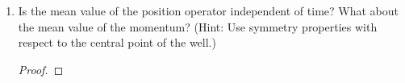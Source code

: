 \documentclass[../psets.tex]{subfiles}
\begin{document}
\begin{enumerate}
\begin{enumerate}
\begin{proof}
\begin{align*}
\begin{split}
                    &+\frac{1}{\sqrt{10}}\sqrt{\frac{2}{a}}\sin(\frac{5\pi x}{a})\e[-iE_5t/\hbar]
                \end{split}\\
                \Aboxed{\psi(x,t) ={}& \pm\sqrt{\frac{6}{5a}}\sin(\frac{\pi x}{a})\e[-iE_1t/\hbar]+\sqrt{\frac{3}{5a}}\sin(\frac{3\pi x}{a})\e[-iE_3t/\hbar]+\frac{1}{\sqrt{5a}}\sin(\frac{5\pi x}{a})\e[-iE_5t/\hbar]}
            \end{align*}
        \end{proof}
        \item Is the mean value of the position operator independent of time? What about the mean value of the momentum? (Hint: Use symmetry properties with respect to the central point of the well.)
        \begin{proof}



\end{proof}
\end{enumerate}
\end{enumerate}
\end{document}
